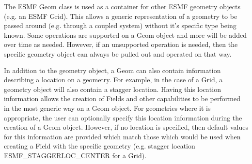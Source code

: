 %


The ESMF Geom class is used as a container for other ESMF geometry objects (e.g. an ESMF Grid). This allows a generic
representation of a geometry to be passed around (e.g. through a coupled system) without it's specific type being known.
Some operations are supported on a Geom object and more will be added over time as needed. However, if
an unsupported operation is needed, then the specific geometry object can always be pulled out and operated on that way.

In addition to the geometry object, a Geom can also contain information describing a location on a geometry. For example, in the case of
a Grid, a geometry object will also contain a stagger location. Having this location information allows the creation of Fields and
other capabilities to be performed in the most generic way on a Geom object. For geometries where it is appropriate, the user can
optionally specify this location information during the creation of a Geom object. However, if no location is specified, then default values for
this information are provided which match those which would be used when creating a Field with the specific geometry
(e.g. stagger location ESMF\_STAGGERLOC\_CENTER for a Grid).
